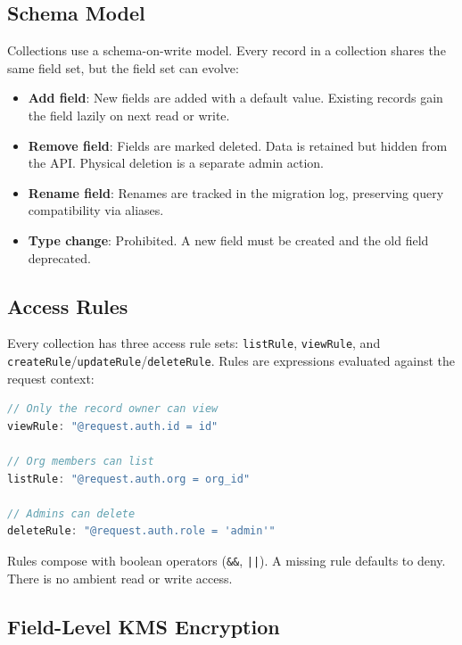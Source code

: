 \documentclass[11pt]{article}
\begin{document}
\subsection{Schema Model}

Collections use a schema-on-write model. Every record in a collection shares
the same field set, but the field set can evolve:

\begin{itemize}[leftmargin=1.1em]
    \item \textbf{Add field}: New fields are added with a default value. Existing
    records gain the field lazily on next read or write.
    \item \textbf{Remove field}: Fields are marked deleted. Data is retained
    but hidden from the API. Physical deletion is a separate admin action.
    \item \textbf{Rename field}: Renames are tracked in the migration log,
    preserving query compatibility via aliases.
    \item \textbf{Type change}: Prohibited. A new field must be created and the
    old field deprecated.
\end{itemize}

\subsection{Access Rules}

Every collection has three access rule sets: \texttt{listRule},
\texttt{viewRule}, and \texttt{createRule}/\texttt{updateRule}/\texttt{deleteRule}.
Rules are expressions evaluated against the request context:

\begin{lstlisting}[language=JavaScript,caption={Collection access rules.}]
// Only the record owner can view
viewRule: "@request.auth.id = id"

// Org members can list
listRule: "@request.auth.org = org_id"

// Admins can delete
deleteRule: "@request.auth.role = 'admin'"
\end{lstlisting}

Rules compose with boolean operators (\texttt{\&\&}, \texttt{||}). A missing
rule defaults to deny. There is no ambient read or write access.

\subsection{Field-Level KMS Encryption}
\end{document}
